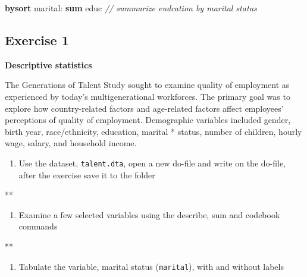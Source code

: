 \documentclass[
]{book}
\newenvironment{Shaded}{\begin{snugshade}}{\end{snugshade}}
\newcommand{\CommentTok}[1]{\textcolor[rgb]{0.56,0.35,0.01}{\textit{#1}}}
\newcommand{\KeywordTok}[1]{\textcolor[rgb]{0.13,0.29,0.53}{\textbf{#1}}}
\newcommand{\NormalTok}[1]{#1}
\providecommand{\tightlist}{%
  \setlength{\itemsep}{0pt}\setlength{\parskip}{0pt}}
\begin{document}
\begin{Shaded}
\begin{Highlighting}[]
\KeywordTok{bysort}\NormalTok{ marital: }\KeywordTok{sum}\NormalTok{ educ }\CommentTok{// summarize eudcation by marital status}
\end{Highlighting}
\end{Shaded}

\hypertarget{exercise-1-6}{%
\subsection{Exercise 1}\label{exercise-1-6}}

\textbf{Descriptive statistics}

The Generations of Talent Study sought to examine quality of employment as experienced by today's multigenerational workforces. The primary goal was to explore how country-related factors and age-related factors affect employees' perceptions of quality of employment. Demographic variables included gender, birth year, race/ethnicity, education, marital * status, number of children, hourly wage, salary, and household income.

\begin{enumerate}
\def\labelenumi{\arabic{enumi}.}
\tightlist
\item
  Use the dataset, \texttt{talent.dta}, open a new do-file and write on the do-file, after the exercise save it to the folder
\end{enumerate}

\begin{Shaded}
\begin{Highlighting}[]
\NormalTok{**}
\end{Highlighting}
\end{Shaded}

\begin{enumerate}
\def\labelenumi{\arabic{enumi}.}
\setcounter{enumi}{1}
\tightlist
\item
  Examine a few selected variables using the describe, sum and codebook commands
\end{enumerate}

\begin{Shaded}
\begin{Highlighting}[]
\NormalTok{**}
\end{Highlighting}
\end{Shaded}

\begin{enumerate}
\def\labelenumi{\arabic{enumi}.}
\setcounter{enumi}{2}
\tightlist
\item
  Tabulate the variable, marital status (\texttt{marital}), with and without labels
\end{enumerate}
\end{document}
